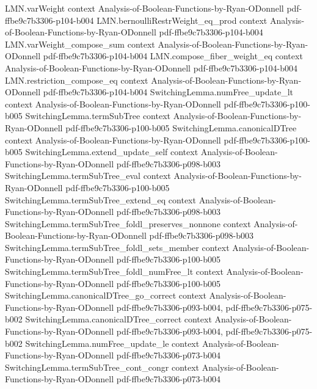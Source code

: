 \begin{lemma}
  {LMN.varWeight}
  {context}
  {Analysis-of-Boolean-Functions-by-Ryan-ODonnell}
  {pdf-ffbe9c7b3306-p104-b004}
\proofstep
  {LMN.bernoulliRestrWeight_eq_prod}
  {context}
  {Analysis-of-Boolean-Functions-by-Ryan-ODonnell}
  {pdf-ffbe9c7b3306-p104-b004}
\proofstep
  {LMN.varWeight_compose_sum}
  {context}
  {Analysis-of-Boolean-Functions-by-Ryan-ODonnell}
  {pdf-ffbe9c7b3306-p104-b004}
\proofstep
  {LMN.compose_fiber_weight_eq}
  {context}
  {Analysis-of-Boolean-Functions-by-Ryan-ODonnell}
  {pdf-ffbe9c7b3306-p104-b004}
\proofstep
  {LMN.restriction_compose_eq}
  {context}
  {Analysis-of-Boolean-Functions-by-Ryan-ODonnell}
  {pdf-ffbe9c7b3306-p104-b004}
\proofstep
  {SwitchingLemma.numFree_update_lt}
  {context}
  {Analysis-of-Boolean-Functions-by-Ryan-ODonnell}
  {pdf-ffbe9c7b3306-p100-b005}
\proofstep
  {SwitchingLemma.termSubTree}
  {context}
  {Analysis-of-Boolean-Functions-by-Ryan-ODonnell}
  {pdf-ffbe9c7b3306-p100-b005}
\proofstep
  {SwitchingLemma.canonicalDTree}
  {context}
  {Analysis-of-Boolean-Functions-by-Ryan-ODonnell}
  {pdf-ffbe9c7b3306-p100-b005}
\proofstep
  {SwitchingLemma.extend_update_self}
  {context}
  {Analysis-of-Boolean-Functions-by-Ryan-ODonnell}
  {pdf-ffbe9c7b3306-p098-b003}
\proofstep
  {SwitchingLemma.termSubTree_eval}
  {context}
  {Analysis-of-Boolean-Functions-by-Ryan-ODonnell}
  {pdf-ffbe9c7b3306-p100-b005}
\proofstep
  {SwitchingLemma.termSubTree_extend_eq}
  {context}
  {Analysis-of-Boolean-Functions-by-Ryan-ODonnell}
  {pdf-ffbe9c7b3306-p098-b003}
\proofstep
  {SwitchingLemma.termSubTree_foldl_preserves_nonnone}
  {context}
  {Analysis-of-Boolean-Functions-by-Ryan-ODonnell}
  {pdf-ffbe9c7b3306-p098-b003}
\proofstep
  {SwitchingLemma.termSubTree_foldl_sets_member}
  {context}
  {Analysis-of-Boolean-Functions-by-Ryan-ODonnell}
  {pdf-ffbe9c7b3306-p100-b005}
\proofstep
  {SwitchingLemma.termSubTree_foldl_numFree_lt}
  {context}
  {Analysis-of-Boolean-Functions-by-Ryan-ODonnell}
  {pdf-ffbe9c7b3306-p100-b005}
\proofstep
  {SwitchingLemma.canonicalDTree_go_correct}
  {context}
  {Analysis-of-Boolean-Functions-by-Ryan-ODonnell}
  {pdf-ffbe9c7b3306-p093-b004,
    pdf-ffbe9c7b3306-p075-b002}
\proofstep
  {SwitchingLemma.canonicalDTree_correct}
  {context}
  {Analysis-of-Boolean-Functions-by-Ryan-ODonnell}
  {pdf-ffbe9c7b3306-p093-b004,
    pdf-ffbe9c7b3306-p075-b002}
\proofstep
  {SwitchingLemma.numFree_update_le}
  {context}
  {Analysis-of-Boolean-Functions-by-Ryan-ODonnell}
  {pdf-ffbe9c7b3306-p073-b004}
\proofstep
  {SwitchingLemma.termSubTree_cont_congr}
  {context}
  {Analysis-of-Boolean-Functions-by-Ryan-ODonnell}
  {pdf-ffbe9c7b3306-p073-b004}

\end{lemma}
